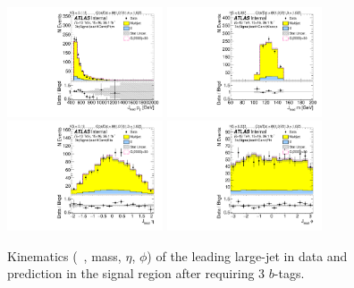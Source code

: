 \begin{figure}[htb!]
\begin{center}
\includegraphics[width=0.41\textwidth,angle=-90]{figures/boosted/Signal/b77_ThreeTag_Signal_leadHCand_Pt_m.pdf}
\includegraphics[width=0.41\textwidth,angle=-90]{figures/boosted/Signal/b77_ThreeTag_Signal_leadHCand_Mass_s.pdf}\\
\includegraphics[width=0.41\textwidth,angle=-90]{figures/boosted/Signal/b77_ThreeTag_Signal_leadHCand_Eta.pdf}
\includegraphics[width=0.41\textwidth,angle=-90]{figures/boosted/Signal/b77_ThreeTag_Signal_leadHCand_Phi.pdf}
  \caption{Kinematics (\pt~, mass, $\eta$, $\phi$) of the leading large-\R jet in data and prediction in the signal region after requiring 3 $b$-tags. }
  \label{fig:boosted-3b-signal-ak10-lead}
\end{center}
\end{figure}

